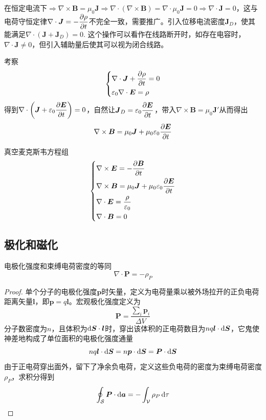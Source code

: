 \documentclass{mynote}
\begin{document}
\begin{proposition}
    在恒定电流下$\Rightarrow \nabla \times \bm{B} = \mu_0 \bm{J} \Rightarrow \nabla \cdot (\nabla \times \bm{B}) = \nabla \cdot \mu_0 \bm{J} = 0 \Rightarrow \nabla \cdot \bm{J} = 0$，这与电荷守恒定律$\nabla \cdot \boldsymbol{J} = -\dfrac{\partial \rho}{\partial t}  $不完全一致，需要推广。引入位移电流密度$\bm{J}_D$，使其能满足$\nabla \cdot (\bm{J} + \bm{J}_D) = 0$. 这个操作可以看作在线路断开时，如存在电容时，$\nabla \cdot \bm{J} \ne 0$，但引入辅助量后使其可以视为闭合线路。

    考察
    \[
    \left\{
        \begin{aligned}
            & \nabla \cdot \boldsymbol{J} + \dfrac{\partial \rho}{\partial t} = 0 \\
            & \varepsilon_0 \nabla \cdot \boldsymbol{E} = \rho
        \end{aligned} 
    \right.    
    \]
    得到$\nabla \cdot \left( \boldsymbol{J} + \varepsilon_0 \dfrac{\partial \boldsymbol{E}}{\partial t} \right) = 0$，自然让$\boldsymbol{J}_D = \varepsilon_0 \dfrac{\partial \boldsymbol{E}}{\partial t}$，带入$\nabla \times \bm{B} = \mu_0 \bm{J}'$从而得出
    \[
        \nabla \times \boldsymbol{B} = \mu_0 \boldsymbol{J} + \mu_0 \varepsilon_0 \dfrac{\partial \boldsymbol{E}}{\partial t}
    \]
\end{proposition}



\begin{theorem}{真空麦克斯韦方程组}
    \[
    \left\{
        \begin{aligned}
            & \nabla \times \boldsymbol{E} = -\dfrac{\partial \boldsymbol{B}}{\partial t} \\
            & \nabla \times \boldsymbol{B} = \mu_0 \boldsymbol{J} + \mu_0 \varepsilon_0 \dfrac{\partial \boldsymbol{E}}{\partial t} \\
            & \nabla \cdot \boldsymbol{E} = \frac{\rho}{\varepsilon_0} \\
            & \nabla \cdot \boldsymbol{B} = 0
        \end{aligned}
    \right.   
    \]
\end{theorem}





\subsection{极化和磁化}
\begin{theorem}{电极化强度和束缚电荷密度的等同}
    \[
        \nabla\cdot \bm{P} = -\rho_P  
    \]
\end{theorem}
\begin{proof}
    单个分子的电极化强度$\bm{p}$时矢量，定义为电荷量乘以被外场拉开的正负电荷距离矢量$\bm{l}$，即$\bm{p} = q \bm{l}$。宏观极化强度定义为
    \[
    \bm{P} = \dfrac{\sum_i \bm{p}_i}{\Delta V}    
    \]
    分子数密度为$n$，且体积为$\mathop{}\!\mathrm{d} \boldsymbol{S} \cdot \boldsymbol{l}$时，穿出该体积的正电荷数目为$nq\boldsymbol{l} \cdot \mathop{}\!\mathrm{d} \boldsymbol{S}$，它鬼使神差地构成了单位面积的电极化强度通量
    \[
        nq\boldsymbol{l} \cdot \mathop{}\!\mathrm{d} \boldsymbol{S} = n\boldsymbol{p} \cdot \mathop{}\!\mathrm{d} \boldsymbol{S} = \boldsymbol{P} \cdot \mathop{}\!\mathrm{d} \boldsymbol{S}
    \]
    由于正电荷穿出面外，留下了净余负电荷，定义这些负电荷的密度为束缚电荷密度$\rho_P$，求积分得到
    \[
    \oint_{\mathcal{S}} \boldsymbol{P}\cdot \mathop{}\!\mathrm{d} \boldsymbol{a} = -\int_{\mathcal{V}} \rho_P \mathop{}\!\mathrm{d} \tau    
    \]
\end{proof}
\end{document}
